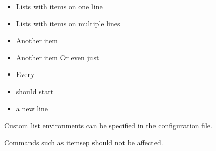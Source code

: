 \documentclass{article}
\begin{document}
\begin{itemize}

  \item Lists with items on one line

  \item Lists with items
    on multiple lines

  \item Another item

  \item Another item
    Or even just %

  \item Every
  \item should start
  \item a new line

\end{itemize}

\begin{myitemize}

  \item Custom list environments can be specified in the configuration file.

\end{myitemize}

Commands such as itemsep should not be affected.
\setlength{\itemsep}{0pt}
\end{document}
